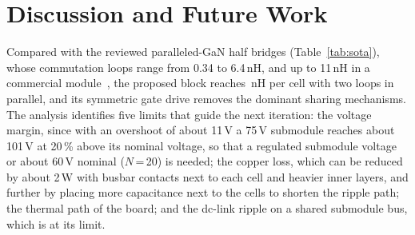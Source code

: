 \documentclass[conference]{IEEEtran}
\begin{document}
\section{Discussion and Future Work}
\begin{table}[t]
\centering
\caption{Comparison With Paralleled-GaN Half Bridges}
\label{tab:sota}
\setlength{\tabcolsep}{2.5pt}
\end{table}

Compared with the reviewed paralleled-GaN half bridges (Table~\ref{tab:sota}), whose commutation loops range from 0.34 to 6.4\,nH, and up to 11\,nH in a commercial module~\cite{brothers2019}, the proposed block reaches \LloopEsl\,nH per cell with two loops in parallel, and its symmetric gate drive removes the dominant sharing mechanisms. The analysis identifies five limits that guide the next iteration: the voltage margin, since with an overshoot of about 11\,V a 75\,V submodule reaches about 101\,V at 20\,\% above its nominal voltage, so that a regulated submodule voltage or about 60\,V nominal ($N$\,=\,20) is needed; the copper loss, which can be reduced by about 2\,W with busbar contacts next to each cell and heavier inner layers, and further by placing more capacitance next to the cells to shorten the ripple path; the thermal path of the board; and the dc-link ripple on a shared submodule bus, which is at its limit.
\end{document}
